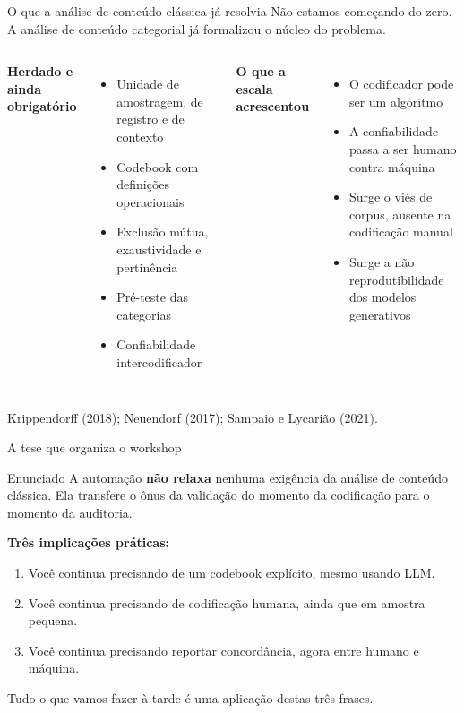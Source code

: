 \documentclass[11pt,aspectratio=169]{beamer}
\begin{document}
\begin{frame}{O que a análise de conteúdo clássica já resolvia}
Não estamos começando do zero. A análise de conteúdo categorial já formalizou o
núcleo do problema.
\vspace{0.25cm}
\begin{columns}[T]
\textbf{Herdado e ainda obrigatório}
\begin{itemize}\small
  \item Unidade de amostragem, de registro e de contexto
  \item Codebook com definições operacionais
  \item Exclusão mútua, exaustividade e pertinência
  \item Pré-teste das categorias
  \item Confiabilidade intercodificador
\end{itemize}
\textbf{O que a escala acrescentou}
\begin{itemize}\small
  \item O codificador pode ser um algoritmo
  \item A confiabilidade passa a ser humano contra máquina
  \item Surge o viés de corpus, ausente na codificação manual
  \item Surge a não reprodutibilidade dos modelos generativos
\end{itemize}
\end{columns}
\vspace{0.2cm}
\footnotesize Krippendorff (2018); Neuendorf (2017); Sampaio e Lycarião (2021).
\end{frame}

\begin{frame}{A tese que organiza o workshop}
\begin{block}{Enunciado}
A automação \textbf{não relaxa} nenhuma exigência da análise de conteúdo
clássica. Ela transfere o ônus da validação do momento da codificação para o
momento da auditoria.
\end{block}
\vspace{0.4cm}
\textbf{Três implicações práticas:}
\begin{enumerate}
  \item Você continua precisando de um codebook explícito, mesmo usando LLM.
  \item Você continua precisando de codificação humana, ainda que em amostra
        pequena.
  \item Você continua precisando reportar concordância, agora entre humano e
        máquina.
\end{enumerate}
\vspace{0.3cm}
\centering
\small Tudo o que vamos fazer à tarde é uma aplicação destas três frases.
\end{frame}
\end{document}
